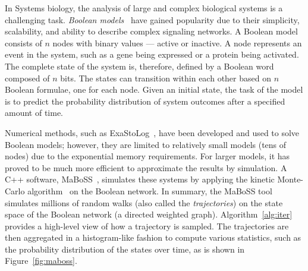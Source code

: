 



In Systems biology, the analysis of large and complex biological systems is a challenging task. \emph{Boolean models}~\cite{wang2012boolean} have gained popularity due to their simplicity, scalability, and ability to describe complex signaling networks. A Boolean model consists of $n$ nodes with binary values --- active or inactive. A node represents an event in the system, such as a gene being expressed or a protein being activated. The complete state of the system is, therefore, defined by a Boolean word composed of $n$ bits. The states can transition within each other based on $n$ Boolean formulae, one for each node. Given an initial state, the task of the model is to predict the probability distribution of system outcomes after a specified amount of time.

Numerical methods, such as ExaStoLog~\cite{koltai2020exact}, have been developed and used to solve Boolean models; however, they are limited to relatively small models (tens of nodes) due to the exponential memory requirements. For larger models, it has proved to be much more efficient to approximate the results by simulation. A C++ software, MaBoSS~\cite{stoll2017maboss}, simulates these systems by applying the kinetic Monte-Carlo algorithm~\cite{stoll2012continuous} on the Boolean network. In summary, the MaBoSS tool simulates millions of random walks (also called the \emph{trajectories}) on the state space of the Boolean network (a directed weighted graph). Algorithm~\ref{alg:iter} provides a high-level view of how a trajectory is sampled. The trajectories are then aggregated in a histogram-like fashion to compute various statistics, such as the probability distribution of the states over time, as is shown in Figure~\ref{fig:maboss}.

